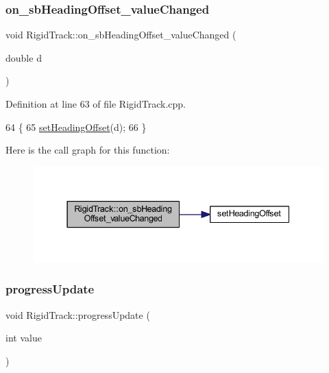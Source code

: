 \subsubsection{\texorpdfstring{on\+\_\+sb\+Heading\+Offset\+\_\+value\+Changed}{on\_sbHeadingOffset\_valueChanged}}
{\footnotesize\ttfamily void Rigid\+Track\+::on\+\_\+sb\+Heading\+Offset\+\_\+value\+Changed (\begin{DoxyParamCaption}\item[{double}]{d }\end{DoxyParamCaption})\hspace{0.3cm}{\ttfamily [slot]}}



Definition at line 63 of file Rigid\+Track.\+cpp.


\begin{DoxyCode}
64 \{
65     \hyperlink{main_8cpp_ad19da4e648bbdc80d3123eb94711588e}{setHeadingOffset}(d);
66 \}
\end{DoxyCode}
Here is the call graph for this function\+:
\nopagebreak
\begin{figure}[H]
\begin{center}
\leavevmode
\includegraphics[width=337pt]{class_rigid_track_a72e338d6bf93d0efa3bc503f7ca736c5_cgraph}
\end{center}
\end{figure}
\mbox{\label{class_rigid_track_a9d229d23fdf40b988a1743accb695ea8}} 
\subsubsection{\texorpdfstring{progress\+Update}{progressUpdate}}
{\footnotesize\ttfamily void Rigid\+Track\+::progress\+Update (\begin{DoxyParamCaption}\item[{int}]{value }\end{DoxyParamCaption})\hspace{0.3cm}{\ttfamily [slot]}}



